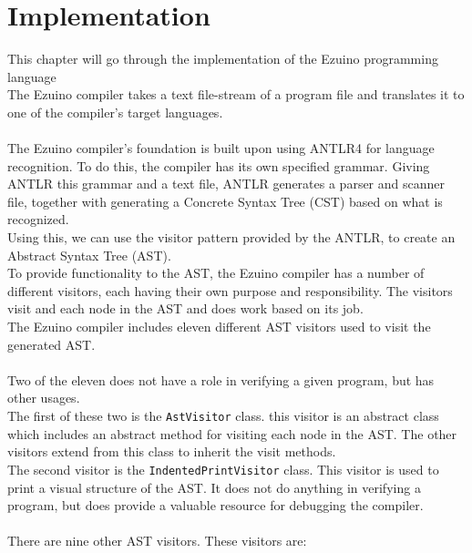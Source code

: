 \chapter{Implementation}
This chapter will go through the implementation of the Ezuino programming language\\
The Ezuino compiler takes a text file-stream of a program file and translates it to one of the compiler’s target languages.
\\\\
The Ezuino compiler’s foundation is built upon using ANTLR4 for language recognition. To do this, the compiler has its own specified grammar. Giving ANTLR this grammar and a text file, ANTLR generates a parser and scanner file, together with generating a Concrete Syntax Tree (CST) based on what is recognized.\\
Using this, we can use the visitor pattern provided by the ANTLR, to create an Abstract Syntax Tree (AST).\\
To provide functionality to the AST, the Ezuino compiler has a number of different visitors, each having their own purpose and responsibility. The visitors visit and each node in the AST and does work based on its job.\\
The Ezuino compiler includes eleven different AST visitors used to visit the generated AST.
\\\\
Two of the eleven does not have a role in verifying a given program, but has other usages.\\
The first of these two is the \texttt{AstVisitor} class. this visitor is an abstract class which includes an abstract method for visiting each node in the AST. The other visitors extend from this class to inherit the visit methods.\\
The second visitor is the \texttt{IndentedPrintVisitor} class. This visitor is used to print a visual structure of the AST. It does not do anything in verifying a program, but does provide a valuable resource for debugging the compiler.
\\\\
There are nine other AST visitors. These visitors are:

